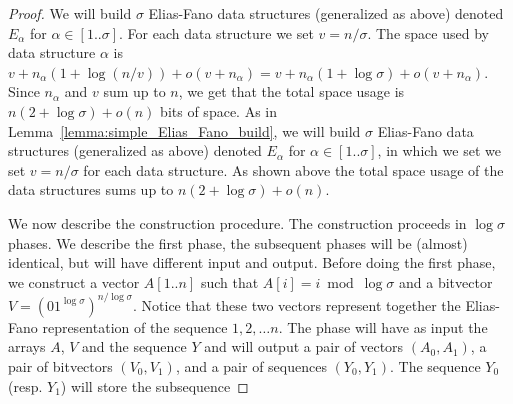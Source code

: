 \documentclass[11pt,runningheads]{llncs}
\begin{document}
\begin{proof}
We will build $\sigma$ Elias-Fano data structures (generalized as above)
denoted $E_\alpha$ for $\alpha\in [1..\sigma]$. 
For each data structure we set $v=n/\sigma$. The space used by data structure 
$\alpha$ is $v+n_\alpha(1+\log(n/v))+o(v+n_\alpha)=v+n_\alpha(1+\log\sigma)+o(v+n_\alpha)$. 
Since $n_\alpha$ and $v$ sum up to $n$, we get that the total space usage is $n(2+\log\sigma)+o(n)$
bits of space. 
As in Lemma~\ref{lemma:simple_Elias_Fano_build}, we will build $\sigma$ Elias-Fano data structures (generalized as above)
denoted $E_\alpha$ for $\alpha\in [1..\sigma]$, in which we set we set $v=n/\sigma$ for each data structure. 
As shown above the total space usage of the data structures sums up to $n(2+\log\sigma)+o(n)$. 

We now describe the construction procedure. The construction proceeds in $\log\sigma$
phases. We describe the first phase, the subsequent phases will be (almost) identical, but 
will have different input and output. 
Before doing the first phase, we construct a vector $A[1..n]$
such that $A[i]=i\bmod \log\sigma$ and a bitvector $V=(01^{\log\sigma})^{n/\log\sigma}$. Notice that these two vectors represent together the Elias-Fano representation of the sequence $1,2,\ldots n$. 
The phase will have as input the arrays $A$, $V$ and the sequence $Y$ and will output a pair of vectors $(A_0,A_1)$, 
a pair of bitvectors $(V_0,V_1)$, and a pair of sequences $(Y_0,Y_1)$. The sequence $Y_0$ (resp. $Y_1$) will store the subsequence 

\end{proof}
\end{document}
